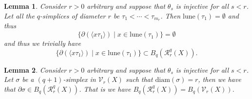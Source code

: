 \documentclass[10pt,a4paper]{amsart}
\newtheorem{lemma}{Lemma}
\newcommand\Vr{\mathcal{V}}
\newcommand\diam{\mathrm{diam}}
\newcommand\lune{\mathrm{lune}}
\newcommand\rvr{\mathcal{R}}
\begin{document}
\begin{lemma}
\label{q-first-edge-proof}
    Consider $r>0$ arbitrary and suppose that $\theta_{s}$ is injective for all $s<r$. Let all the $q$-simplices of diameter $r$ be $\tau_{1}  < \cdots < \tau_{m_r} $. Then $\lune (\tau_{1}) = \emptyset$ and thus
    \begin{equation}
    \label{q-same-edges-equation-1}
         \{ \partial (\langle  x \tau_{1} \rangle) \; | \; x\in \lune (\tau_{1}) \} = \emptyset 
    \end{equation}
    and thus we trivially have 
    \begin{equation}
    \label{q-same-edges-equation-1-1}
         \{ \partial (\langle  x \tau_{1} \rangle) \; | \; x\in \lune (\tau_{1}) \} \subset B_{q}(\rvr_{r}^{q}(X)).
    \end{equation}
\end{lemma}

\begin{lemma}
\label{q-the-big-lemma}
    Consider $r>0$ arbitrary and suppose that $\theta_{s}$ is injective for all $s<r$. Let $\sigma$ be a $(q+1)$-simplex in $\Vr_{r}(X)$ such that $\diam (\sigma) = r$, then we have that $\partial \sigma \in B_{q}(\rvr_{r}^{q}(X))$. That is we have $B_{q}(\rvr_{r}^{q}(X)) = B_{q}(\Vr_{r}(X))$.
\end{lemma}
\end{document}
